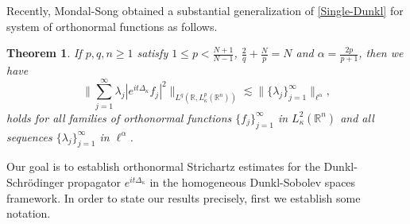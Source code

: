 \documentclass[a4paper,11pt, reqno]{amsart}
\numberwithin{equation}{section}
\theoremstyle{plain}
\newtheorem{theorem}{Theorem}[section]
\theoremstyle{definition}
\theoremstyle{remark}
\begin{document}
Recently, Mondal-Song \cite{MS} obtained a substantial generalization of \eqref{Single-Dunkl} for system of orthonormal
functions as follows. 
\begin{theorem} \label{M-S}
If $p,q,n\geq 1$ satisfy 
$1\leq p<\frac{N+1}{N-1}$, $\frac{2}{q}+\frac{N}{p}=N$ and $\alpha=\frac{2p}{p+1}$, then we have
\begin{equation*}
			\bigg\|\sum_{j=1}^\infty \lambda_j|e^{it\Delta_\kappa}f_j|^2\bigg\|_{L^q(\mathbb{R}, L_\kappa^p(\mathbb{R}^n))}\lesssim \|\{\lambda_j\}^\infty_{j=1}\|_{\ell^{\alpha}},
\end{equation*}	
  holds for all families of orthonormal functions $\{f_j\}_{j=1}^\infty$ in $L_\kappa^2(\mathbb{R}^n)$ and all sequences $\{\lambda_j\}^\infty_{j=1}$ in $\ell^{\alpha}$. 
\end{theorem}
Our goal  is to establish orthonormal Strichartz estimates for the Dunkl-Schr\"odinger propagator  $e^{it\Delta_\kappa}$ in the homogeneous Dunkl-Sobolev spaces framework. In order to state our results precisely, first we establish some notation.
\end{document}
